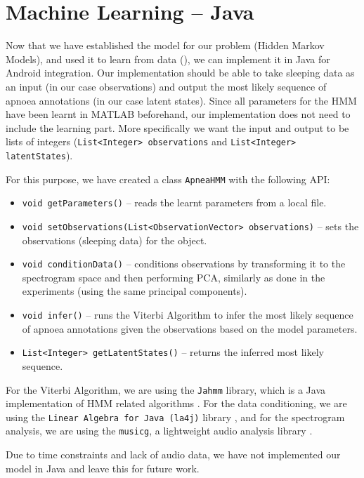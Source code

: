 \section{Machine Learning -- Java}
\label{sec:mljava}

Now that we have established the model for our problem (Hidden Markov Models), and used it to learn from data (), we can implement it in Java for Android integration. Our implementation should be able to take sleeping data as an input (in our case observations) and output the most likely sequence of apnoea annotations (in our case latent states). Since all parameters for the HMM have been learnt in MATLAB beforehand, our implementation does not need to include the learning part. More specifically we want the input and output to be lists of integers (\verb!List<Integer> observations! and \verb!List<Integer> latentStates!).

For this purpose, we have created a class \verb!ApneaHMM! with the following API:
\begin{itemize}
	\item \verb!void getParameters()! -- reads the learnt parameters from a local file.
	\item \verb!void setObservations(List<ObservationVector> observations)! -- sets the observations (sleeping data) for the object.
	\item \verb!void conditionData()! -- conditions observations by transforming it to the spectrogram space and then performing PCA, similarly as done in the experiments (using the same principal components).
	\item \verb!void infer()! -- runs the Viterbi Algorithm to infer the most likely sequence of apnoea annotations given the observations based on the model parameters.
	\item \verb!List<Integer> getLatentStates()! -- returns the inferred most likely sequence.
\end{itemize}

For the Viterbi Algorithm, we are using the \verb!Jahmm! library, which is a Java implementation of HMM related algorithms \cite{jahmm}. For the data conditioning, we are using the \verb!Linear Algebra for Java (la4j)! library \cite{la4j}, and for the spectrogram analysis, we are using the \verb!musicg!, a lightweight audio analysis library \cite{musicg}.

Due to time constraints and lack of audio data, we have not implemented our model in Java and leave this for future work.